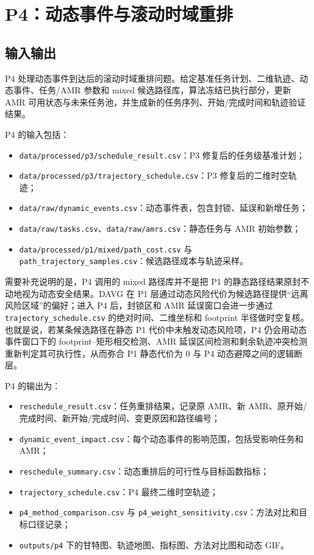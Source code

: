 ﻿\section{P4：动态事件与滚动时域重排}

\subsection{输入输出}

P4 处理动态事件到达后的滚动时域重排问题。给定基准任务计划、二维轨迹、动态事件、任务/AMR 参数和 mixed 候选路径库，算法冻结已执行部分，更新 AMR 可用状态与未来任务池，并生成新的任务序列、开始/完成时间和轨迹验证结果。

P4 的输入包括：

\begin{itemize}
  \item \verb|data/processed/p3/schedule_result.csv|：P3 修复后的任务级基准计划；
  \item \verb|data/processed/p3/trajectory_schedule.csv|：P3 修复后的二维时空轨迹；
  \item \verb|data/raw/dynamic_events.csv|：动态事件表，包含封锁、延误和新增任务；
  \item \verb|data/raw/tasks.csv|、\verb|data/raw/amrs.csv|：静态任务与 AMR 初始参数；
  \item \verb|data/processed/p1/mixed/path_cost.csv| 与 \verb|path_trajectory_samples.csv|：候选路径成本与轨迹采样。
\end{itemize}

需要补充说明的是，P4 调用的 mixed 路径库并不是把 P1 的静态路径结果原封不动地视为动态安全结果。DAVG 在 P1 层通过动态风险代价为候选路径提供“远离风险区域”的偏好；进入 P4 后，封锁区和 AMR 延误窗口会进一步通过 \verb|trajectory_schedule.csv| 的绝对时间、二维坐标和 footprint 半径做时空复核。也就是说，若某条候选路径在静态 P1 代价中未触发动态风险项，P4 仍会用动态事件窗口下的 footprint--矩形相交检测、AMR 延误区间检测和剩余轨迹冲突检测重新判定其可执行性，从而弥合 P1 静态代价为 0 与 P4 动态避障之间的逻辑断层。

P4 的输出为：

\begin{itemize}
  \item \verb|reschedule_result.csv|：任务重排结果，记录原 AMR、新 AMR、原开始/完成时间、新开始/完成时间、变更原因和路径编号；
  \item \verb|dynamic_event_impact.csv|：每个动态事件的影响范围，包括受影响任务和 AMR；
  \item \verb|reschedule_summary.csv|：动态重排后的可行性与目标函数指标；
  \item \verb|trajectory_schedule.csv|：P4 最终二维时空轨迹；
  \item \verb|p4_method_comparison.csv| 与 \verb|p4_weight_sensitivity.csv|：方法对比和目标口径记录；
  \item \verb|outputs/p4| 下的甘特图、轨迹地图、指标图、方法对比图和动态 GIF。
\end{itemize}

